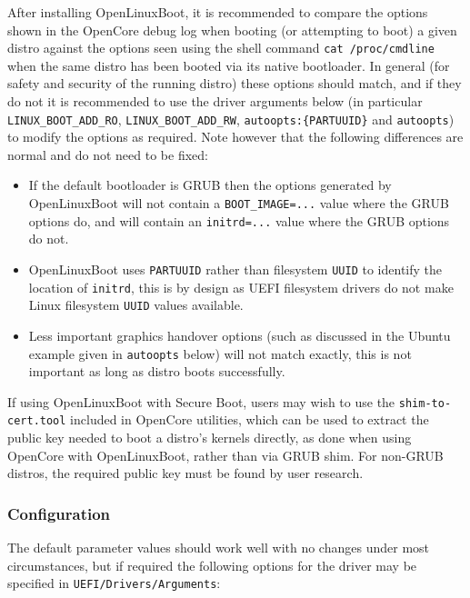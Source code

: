 \documentclass[]{article}
\providecommand{\tightlist}{%
  \setlength{\itemsep}{0pt}\setlength{\parskip}{0pt}}
\begin{document}
After installing OpenLinuxBoot, it is recommended to compare the options shown in the OpenCore debug
log when booting (or attempting to boot) a given distro against the options seen using the shell command
\texttt{cat /proc/cmdline} when the same distro has been booted via its native bootloader.
In general (for safety and security of the running distro) these options should match, and if they do not
it is recommended to use the driver arguments below (in particular \texttt{LINUX\_BOOT\_ADD\_RO},
\texttt{LINUX\_BOOT\_ADD\_RW}, \texttt{autoopts:\{PARTUUID\}} and \texttt{autoopts}) to modify the options as required.
Note however that the following differences are normal and do not need to be fixed:
\begin{itemize}
\tightlist
  \item
  If the default bootloader is GRUB then the options generated by OpenLinuxBoot will not contain a
  \texttt{BOOT\_IMAGE=...} value where the GRUB options do, and will contain an \texttt{initrd=...}
  value where the GRUB options do not.
  \item
  OpenLinuxBoot uses \texttt{PARTUUID} rather than filesystem \texttt{UUID} to identify the location
  of \texttt{initrd}, this is by design as UEFI filesystem drivers do not make Linux filesystem
  \texttt{UUID} values available.
  \item
  Less important graphics handover options (such as discussed in the Ubuntu example
  given in \texttt{autoopts} below) will not match exactly, this is not important as long
  as distro boots successfully.
\end{itemize}

If using OpenLinuxBoot with Secure Boot, users may wish to use the \texttt{shim-to-cert.tool} included in OpenCore
utilities, which can be used to extract the public key needed to boot a distro's kernels directly, as done when using OpenCore
with OpenLinuxBoot, rather than via GRUB shim. For non-GRUB distros, the required public key must be found by user research.

\subsubsection{Configuration}

The default parameter values should work well with no changes under most circumstances, but if required the following
options for the driver may be specified in \texttt{UEFI/Drivers/Arguments}:
\end{document}

